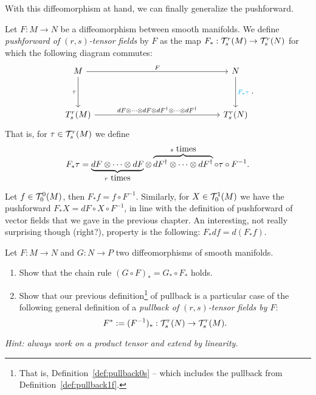 With this diffeomorphism at hand, we can finally generalize the pushforward.

\begin{definition}
  Let $F:M\to N$ be a diffeomorphism between smooth manifolds.
  We define \emph{pushforward of $(r,s)$-tensor fields} by $F$ as the map $F_*: \mathcal{T}_s^r(M) \to \mathcal{T}_s^r(N)$ for which the following diagram commutes:
  \begin{equation}
    \begin{tikzcd}[row sep=huge, column sep=huge]
      M \arrow[r, "F"] \arrow[d, "\tau" left]
      &[10em] N \arrow[d, "F_* \tau" cyan] \\
      T_s^r(M) \arrow[r, "dF \otimes\cdots\otimes dF \otimes dF^\dagger \otimes\cdots\otimes dF^\dagger "]
      & T_s^r(N)
    \end{tikzcd}.
  \end{equation}
  That is, for $\tau\in\mathcal{T}_s^r(M)$ we define
  \begin{equation}
    F_*\tau = \LaTeXunderbrace{dF \otimes\cdots\otimes dF}_{r\mbox{ times}} \otimes \LaTeXoverbrace{dF^\dagger \otimes\cdots\otimes dF^\dagger }^{s\mbox{ times}} \circ \tau \circ F^{-1}.
  \end{equation}
\end{definition}

\begin{example}
  Let $f\in\mathcal{T}_0^0(M)$, then $F_* f = f\circ F^{-1}$.
  Similarly, for $X\in\mathcal{T}_0^1(M)$ we have the pushforward $F_* X = dF\circ X \circ F^{-1}$, in line with the definition of pushforward of vector fields that we gave in the previous chapter.
  An interesting, not really surprising though (right?), property is the following: $F_* df = d(F_* f)$.
\end{example}

\begin{exercise}
  Let $F:M\to N$ and $G:N\to P$ two diffeomorphisms of smooth manifolds.
  \begin{enumerate}
    \item Show that the chain rule $(G\circ F)_* = G_* \circ F_*$ holds.
    \item Show that our previous definition\footnote{That is, Definition~\ref{def:pullback0s} -- which includes the pullback from Definition~\ref{def:pullback1f}.} of pullback is a particular case of the following general definition of a \emph{pullback of $(r,s)$-tensor fields by $F$}:
          \begin{equation}
            F^* := (F^{-1})_* : \mathcal{T}_s^r(N) \to \mathcal{T}_s^r(M).
          \end{equation}
  \end{enumerate}
  \textit{\small Hint: always work on a product tensor and extend by linearity.}
\end{exercise}

